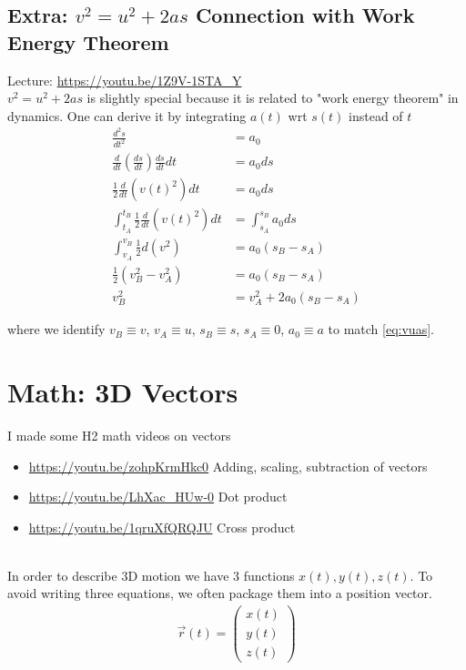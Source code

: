 \documentclass{article}
\begin{document}
\subsection{Extra: $v^2 = u^2 + 2as$ Connection with Work Energy Theorem}
Lecture: \url{https://youtu.be/1Z9V-1STA_Y} \\[10pt]
$v^2 = u^2 + 2as$ is slightly special because it is related to "work energy theorem" in dynamics. One can derive it by integrating $a(t)$ wrt $s(t)$ instead of $t$ 
\begin{align}
    \frac{d^2 s}{dt^2} &= a_0 \\
    \frac{d}{dt} \left(\frac{ds}{dt}\right) \frac{ds}{dt} dt &= a_0 ds \\
    \frac{1}{2} \frac{d}{dt} \left( v(t)^2 \right) dt &= a_0 ds \\
    \int_{t_A}^{t_B} \frac{1}{2} \frac{d}{dt} \left( v(t)^2 \right) dt &= \int_{s_A}^{s_B} a_0 ds \\
    \int_{v_A}^{v_B} \frac{1}{2} d\left( v^2 \right) &= a_0 (s_B - s_A) \\
    \frac{1}{2} (v_B^2 - v_A^2) &= a_0 (s_B - s_A) \\
    v_B^2 &= v_A^2 + 2a_0(s_B - s_A)
\end{align}

where we identify $v_B \equiv v$, $v_A \equiv u$, $s_B \equiv s$, $s_A \equiv 0$, $a_0 \equiv a$ to match \ref{eq:vuas}.
\\
 

\section{Math: 3D Vectors}

I made some H2 math videos on vectors 
\begin{itemize}
    \item \url{https://youtu.be/zohpKrmHkc0} Adding, scaling, subtraction of vectors
    \item \url{https://youtu.be/LhXac_HUw-0} Dot product
    \item \url{https://youtu.be/1qruXfQRQJU} Cross product
\end{itemize}
\leavevmode \\
In order to describe 3D motion we have 3 functions $x(t),y(t),z(t)$. To avoid writing three equations, we often package them into a position vector.
\begin{align}
    \vec{r}(t) = \left(
    \begin{array}{c}  
         x(t) \\
         y(t) \\
         z(t)
    \end{array}
    \right)
\end{align}
\end{document}
